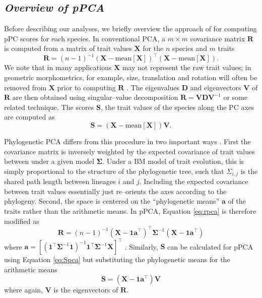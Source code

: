 \documentclass[a4paper,12pt]{article}
\begin{document}
\subsection{\emph{Overview of pPCA}}
Before describing our analyses, we briefly overview the approach of \citet{Revell2008} for computing pPC scores for each species. In conventional PCA, a $m \times m$ covariance matrix $\mathbf{R}$ is computed from a matrix of trait values $\mathbf{X}$ for the $n$ species and $m$ traits
\begin{equation}\label{eq:rpca}
\mathbf{R} = (n-1)^{-1}(\mathbf{X} - \text{mean}[\mathbf{X}])^\intercal (\mathbf{X} - \text{mean}[\mathbf{X}]).
\end{equation}
We note that in many applications $\mathbf{X}$ may not represent the raw trait values; in geometric morphometrics, for example, size, translation and rotation will often be removed from $\mathbf{X}$ prior to computing $\mathbf{R}$ \citep{RohlfSlice, Bookstein1997}. The eigenvalues $\mathbf{D}$ and eigenvectors $\mathbf{V}$ of $\mathbf{R}$ are then obtained using singular--value decomposition $\mathbf{R}=\mathbf{V}\mathbf{D}\mathbf{V}^{-1}$ or some related technique. The scores $\mathbf{S}$, the trait values of the species along the PC axes are computed as
\begin{equation}\label{eq:Spca}
\mathbf{S}=(\mathbf{X} - \text{mean}[\mathbf{X}])\mathbf{V}.
\end{equation}

Phylogenetic PCA differs from this procedure in two important ways \citep{Revell2008,Polly2013} . First the covariance matrix is inversely weighted by the expected covariance of trait values between under a given model $\mathbf{\Sigma}$. Under a BM model of trait evolution, this is simply proportional to the structure of the phylogenetic tree, such that $\Sigma_{i,j}$ is the shared path length between lineages $i$ and $j$. Including the expected covariance between trait values essentially just re--orients the axes according to the phylogeny. Second, the space is centered on the ``phylogenetic means'' $\mathbf{a}$ of the traits rather than the arithmetic means. In pPCA, Equation \ref{eq:rpca} is therefore modified as
\begin{equation}\label{eq:rppca}
\mathbf{R} = (n-1)^{-1}(\mathbf{X} - \mathbf{1a}^\intercal)^\intercal \mathbf{\Sigma}^{-1} (\mathbf{X} - \mathbf{1a}^\intercal)
\end{equation}
where $\mathbf{a}=[(\mathbf{1}^\intercal \mathbf{\Sigma}^{-1} \mathbf{1})^{-1} 
\mathbf{1}^\intercal \mathbf{\Sigma}^{-1} \mathbf{X}]^\intercal$ \citep{RevellHarmon2008,Revell2008}. Similarly, $\mathbf{S}$ can be calculated for pPCA using Equation \ref{eq:Spca} but substituting the phylogenetic means for the arithmetic means
\begin{equation}\label{eq:Sppca}
\mathbf{S}=(\mathbf{X} - \mathbf{1a}^\intercal)\mathbf{V}
\end{equation}
where again, $\mathbf{V}$ is the eigenvectors of $\mathbf{R}$.
\end{document}
